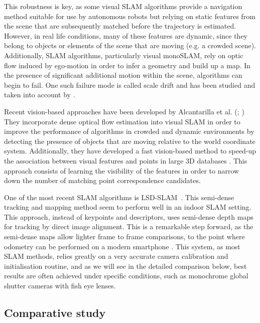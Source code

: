 This robustness is key, as some visual SLAM algorithms provide a navigation method suitable for use by autonomous robots \citep{konolige2007frame} but relying on static features from the scene that are subsequently matched before the trajectory is estimated. However, in real life conditions, many of these features are dynamic, since they belong to objects or elements of the scene that are moving (e.g. a crowded scene). Additionally, SLAM algorithms, particularly visual monoSLAM, rely on optic flow induced by ego-motion in order to infer a geometry and build up a map. In the presence of significant additional motion within the scene, algorithms can begin to fail.  One such failure mode is called scale drift and has been studied and taken into account by \cite{strasdat2010scale}. 

Recent vision-based approaches have been developed by Alcantarilla et al. (\citeyear{alcantarilla2010visual}; \citeyear{alcantarilla2012combining}) They incorporate dense optical flow estimation into visual SLAM in order to improve the performance of algorithms in crowded and dynamic environments by detecting the presence of objects that are moving relative to the world coordinate system. Additionally, they have developed a fast vision-based method to speed-up the association between visual features and points in large 3D databases \citep{alcantarilla2010learning}. This approach consists of learning the visibility of the features in order to narrow down the number of matching point correspondence candidates.

One of the most recent SLAM algorithms is LSD-SLAM~\citep{engel14eccv}. This semi-dense tracking and mapping method seem to perform well in an indoor SLAM setting. This approach, instead of keypoints and descriptors, uses semi-dense depth maps for tracking by direct image alignment. This is a remarkable step forward, as the semi-dense maps allow lighter frame to frame comparisons, to the point where odometry can be performed on a modern smartphone \citep{schoeps14ismar}. This system, as most SLAM methods, relies greatly on a very accurate camera calibration and initialisation routine, and as we will see in the detailed comparison below, best results are often achieved under specific conditions, such as monochrome global shutter cameras with fish eye lenses.

\subsection{Comparative study}

